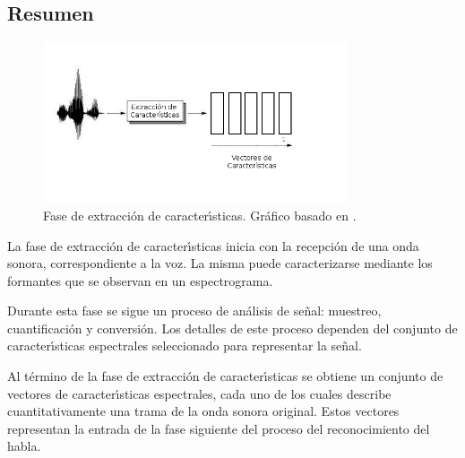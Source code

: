 \subsection{Resumen}

\begin{figure}[H] 
\centering
\includegraphics[width=0.8\textwidth]{./graphics/extraccion.png}
\caption{Fase de extracci\'on de caracter{\'\i}sticas. Gr\'afico basado en \cite{VerenichASR}.}
\label{figure:feature-extraction}
\end{figure}

La fase de extracci\'on de caracter{\'\i}sticas inicia con la recepci\'on de una onda sonora,
correspondiente a la voz.
La misma puede caracterizarse mediante los formantes que se observan en un espectrograma.

Durante esta fase se sigue un proceso de an\'alisis de se\~nal: muestreo, cuantificaci\'on y conversi\'on.
Los detalles de este proceso dependen del conjunto de caracter{\'\i}sticas espectrales seleccionado 
para representar la se\~nal.

Al t\'ermino de la fase de extracci\'on de caracter{\'\i}sticas se obtiene un conjunto de vectores 
de caracter{\'\i}sticas espectrales, cada uno de los cuales describe cuantitativamente una trama de
la onda sonora original. Estos vectores representan la entrada de la fase siguiente del proceso del reconocimiento del habla.